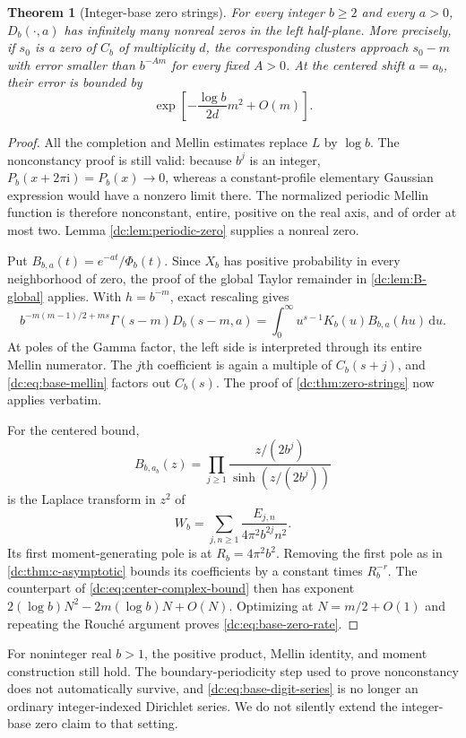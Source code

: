 \documentclass[11pt,a4paper,oneside,openany]{book}
\numberwithin{equation}{chapter}
\newtheorem{theorem}{Theorem}[chapter]
\theoremstyle{definition}
\theoremstyle{remark}
\newcommand{\dd}{\,\mathrm d}
\newcommand{\ii}{\mathrm i}
\begin{document}
\begin{theorem}[Integer-base zero strings]
\label{dc:thm:base-zeros}
For every integer $b\ge2$ and every $a>0$, $D_b(\cdot,a)$ has
infinitely many nonreal zeros in the left half-plane. More precisely,
if $s_0$ is a zero of $C_b$ of multiplicity $d$, the corresponding
clusters approach $s_0-m$ with error smaller than $b^{-Am}$ for
every fixed $A>0$.
At the centered shift $a=a_b$, their error is bounded by
\begin{equation}
 \exp\left[-\frac{\log b}{2d}m^2+O(m)\right].
 \label{dc:eq:base-zero-rate}
\end{equation}
\end{theorem}
\begin{proof}
All the completion and Mellin estimates replace $L$ by $\log b$.
The nonconstancy proof is still valid: because $b^j$ is an integer,
$P_b(x+2\pi\ii)=P_b(x)\to0$, whereas a constant-profile elementary
Gaussian expression would have a nonzero limit there.
The normalized periodic Mellin function is therefore nonconstant,
entire, positive on the real axis, and of order at most two.
Lemma \ref{dc:lem:periodic-zero} supplies a nonreal zero.

Put $B_{b,a}(t)=e^{-at}/\Phi_b(t)$. Since $X_b$ has positive
probability in every neighborhood of zero, the proof of the global
Taylor remainder in \cref{dc:lem:B-global} applies. With $h=b^{-m}$,
exact rescaling gives
\[
 b^{-m(m-1)/2+ms}\Gamma(s-m)D_b(s-m,a)
 =\int_0^\infty u^{s-1}K_b(u)B_{b,a}(hu)\dd u.
\]
At poles of the Gamma factor, the left side is interpreted through
its entire Mellin numerator. The $j$th coefficient is again a multiple of $C_b(s+j)$, and
\cref{dc:eq:base-mellin} factors out $C_b(s)$. The proof of
\cref{dc:thm:zero-strings} now applies verbatim.

For the centered bound,
\[
 B_{b,a_b}(z)=\prod_{j\ge1}
       \frac{z/(2b^j)}{\sinh(z/(2b^j))}
\]
is the Laplace transform in $z^2$ of
\[
 W_b=\sum_{j,n\ge1}\frac{E_{j,n}}{4\pi^2b^{2j}n^2}.
\]
Its first moment-generating pole is at $R_b=4\pi^2b^2$.
Removing the first pole as in \cref{dc:thm:c-asymptotic} bounds its
coefficients by a constant times $R_b^{-r}$. The counterpart of
\cref{dc:eq:center-complex-bound} then has exponent
$2(\log b)N^2-2m(\log b)N+O(N)$.
Optimizing at $N=m/2+O(1)$ and repeating the Rouch\'e argument
proves \cref{dc:eq:base-zero-rate}.
\end{proof}

For noninteger real $b>1$, the positive product, Mellin identity,
and moment construction still hold. The boundary-periodicity step
used to prove nonconstancy does not automatically survive, and
\cref{dc:eq:base-digit-series} is no longer an ordinary integer-indexed
Dirichlet series. We do not silently extend the integer-base zero
claim to that setting.
\end{document}
